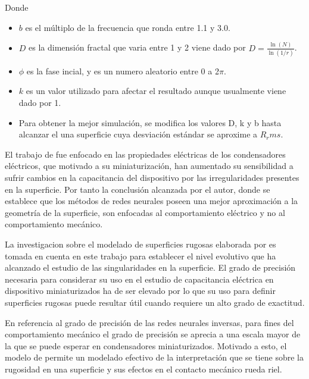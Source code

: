 \documentclass[main]{subfiles}
\begin{document}
  \par \hspace{1cm}
\begin{minipage}{10cm}
\begin{spacing}{0.5}
  Donde 
\begin{itemize}
\item $b$ es el múltiplo de la frecuencia que ronda entre 1.1 y 3.0.
\item $D$ es la dimensión fractal que varia entre 1 y 2 viene dado por $D=\frac{\ln(N)}{\ln(1/r)}$.
\item  $\phi$ es la fase incial, y es un numero aleatorio entre 0 a 2$\pi$.
\item $k$ es un valor utilizado para afectar el resultado aunque usualmente viene dado por 1.
\item Para obtener la mejor simulación, se modifica los valores D, k y b hasta alcanzar el una superficie cuya desviación estándar se aproxime a $R_rms$.
\end{itemize}  

  \end{spacing}
\end{minipage}
  

	El trabajo de \citet{Patrikar2004213} fue enfocado en las propiedades eléctricas de los condensadores eléctricos, que motivado a su miniaturización, han aumentado su sensibilidad a sufrir cambios en la capacitancia del dispositivo por las irregularidades presentes en la superficie. Por tanto la conclusión alcanzada por el autor, donde se establece que los métodos de redes neurales poseen una mejor aproximación a la geometría de la superficie, son enfocadas al comportamiento eléctrico y no al comportamiento mecánico.
	
	La investigacion sobre el modelado de superficies rugosas elaborada por \citet{Patrikar2004213} es tomada en cuenta en este trabajo para establecer el nivel evolutivo que ha alcanzado el estudio de las singularidades en la superficie. El grado de precisión necesaria para considerar su uso en el estudio de capacitancia eléctrica en dispositivo miniaturizados ha de ser elevado por lo que su uso para definir superficies rugosas puede resultar útil cuando requiere un alto grado de exactitud.
	
	 En referencia al grado de precisión de las redes neurales inversas, para fines del comportamiento mecánico el grado de precisión se aprecia a una escala mayor de la que se puede esperar en condensadores miniaturizados. Motivado a esto, el modelo de \citet{Greenwood06121966} permite un modelado efectivo de la interpretación que se tiene sobre la rugosidad en una superficie y sus efectos en el contacto mecánico rueda riel.
	 
\end{document}
